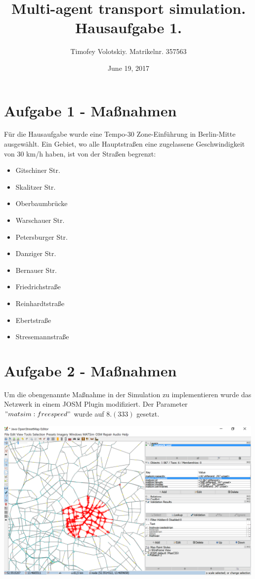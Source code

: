 \documentclass[12pt]{report}
\date{June 19, 2017}
\begin{document}
	\title{Multi-agent transport simulation. Hausaufgabe 1.}
	
\author{Timofey Volotskiy. Matrikelnr. 357563}
\maketitle

\section{Aufgabe 1 - Maßnahmen}

Für die Hausaufgabe wurde eine Tempo-30 Zone-Einführung in Berlin-Mitte ausgewählt. Ein Gebiet, wo alle Hauptstraßen eine zugelassene Geschwindigkeit von 30 km/h haben, ist von der Straßen begrenzt: 

\begin{itemize}
	\item Gitschiner Str. 
	\item Skalitzer Str. 
	\item Oberbaumbrücke 
	\item	Warschauer Str.
	\item	Petersburger Str.
	\item Danziger Str.
	\item Bernauer Str.
	\item Friedrichstraße
	\item Reinhardtstraße
	\item Ebertstraße
	\item Stresemannstraße
\end{itemize}


\section{Aufgabe 2 - Maßnahmen}

Um die obengenannte Maßnahme in der Simulation zu implementieren wurde das Netzwerk in einem JOSM Plugin modifiziert. Der Parameter $ "matsim:freespeed" $ wurde auf $ 8.(333) $ gesetzt.

\begin{center}
\includegraphics[width = 500]{tempo30zoneJOSM}
\end{center}
\end{document}
